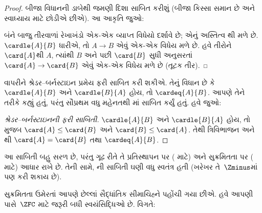 \begin{proof}
બીજા વિધાનની ડાબેથી જમણી દિશા સાબિત કરીશું
(બીજા કિસ્સા સમાન છે અને સ્વાધ્યાય માટે છોડીએ છીએ).
આ આકૃતિ જુઓ:
\begin{center}
\end{center}
બંને બાજુ તીરવાળાં રેખાખંડો એક-એક વ્યાપ્ત વિધેયો દર્શાવે છે;
એનું અસ્તિત્વ થી મળે છે.
$\cardle{A}{B}$ ધારીએ, તો $A\to B$ એવું
એક-એક વિધેય મળે છે. હવે તીરોને $\card{A}$થી
$A$, ત્યાંથી $B$ અને પછી $\card{B}$ સુધી અનુસરતાં
$\card{A} \to \card{B}$ એવું એક-એક વિધેય મળે
છે (તૂટક તીર).
\end{proof}\noindent {} વાપરીને
શ્રેડર--બર્નસ્ટાઇન પ્રમેય ફરી સાબિત કરી શકીએ.
તેનું વિધાન છે કે $\cardle{A}{B}$ અને
$\cardle{B}{A}$ હોય, તો $\cardeq{A}{B}$.
આપણે તેને 
તરીકે કહ્યું હતું, પરંતુ સૌપ્રથમ વધુ મહેનતથી
માં સાબિત કર્યું હતું.
હવે જુઓ:

\begin{proof}[શ્રેડર--બર્નસ્ટાઇનની ફરી સાબિતી]
$\cardle{A}{B}$ અને $\cardle{B}{A}$ હોય, તો
 મુજબ
$\card{A} \leq \card{B}$ અને
$\card{B} \leq \card{A}$. તેથી ત્રિવિભાજન અને
થી
$\card{A} = \card{B}$ તથા $\cardeq{A}{B}$.
\end{proof}
\noindent
આ સાબિતી બહુ સરળ છે, પરંતુ ગૂઢ રીતે તે
પ્રતિસ્થાપન પર
(
માટે) અને સુક્રમિતતા પર
( માટે)
આધાર રાખે છે. તેની સામે,
ની સાબિતી
ઘણી વધુ સ્વતંત્ર હતી (ખરેખર તે~$\Zminus$માં પણ
કરી શકાય છે).
\endgroup

\begingroup
\makeatletter{}\makeatother

\label{guunit:OLP-0583}


સુક્રમિતતા ઉમેરતાં આપણે છેલ્લાં સૈદ્ધાંતિક
સીમાચિહ્ને પહોંચી ગયા છીએ. હવે આપણી પાસે~$\ZFC$
માટે જરૂરી બધી સ્વયંસિદ્ધિઓ છે. વિગતે:

